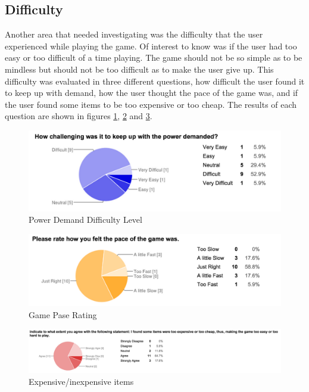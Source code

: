 \documentclass[msc,oneside]{ubcthesis}%
\begin{document}
\newpage
\subsection{Difficulty}
\indent Another area that needed investigating was the difficulty that the user experienced while playing the game. Of interest to know was if the user had too easy or too difficult of a time playing. The game should not be so simple as to be mindless but should not be too difficult as to make the user give up. This difficulty was evaluated in three different questions, how difficult the user found it to keep up with demand, how the user thought the pace of the game was, and if the user found some items to be too expensive or too cheap. The results of each question are shown in figures \ref{powerDemanded}, \ref{gamePase} and \ref{cost}.
\bigskip
\newpage
\begin{figure}[hbt]
  \begin{center}
    \includegraphics[width=1\textwidth]{survey_pics/numeric/power_demanded}
    \caption[pd]{Power Demand Difficulty Level}\label{powerDemanded}
  \end{center}
\end{figure}

\begin{figure}[hbt]
  \begin{center}
    \includegraphics[width=1\textwidth]{survey_pics/numeric/game_pase}
    \caption[p]{Game Pase Rating}\label{gamePase}
  \end{center}
\end{figure}

\bigskip
\begin{figure}[hbt]
  \begin{center}
    \includegraphics[width=1\textwidth]{survey_pics/numeric/cost}
    \caption[Power Source ]{Expensive/inexpensive items}\label{cost}
  \end{center}
\end{figure}
\end{document}
